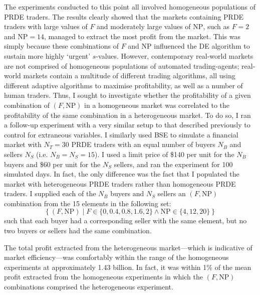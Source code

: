 \documentclass[conference]{IEEEtran}
\begin{document}
The experiments conducted to this point all involved homogeneous populations of PRDE traders.
The results clearly showed that the markets containing PRDE traders with large values of $F$ and moderately large values of $\mathrm{NP}$, such as $F=2$ and $\mathrm{NP}=14$, managed to extract the most profit from the market.
This was simply because these combinations of $F$ and $\mathrm{NP}$ influenced the DE algorithm to sustain more highly `urgent' $s$-values.
However, contemporary real-world markets are not comprised of homogeneous populations of automated trading-agents; real-world markets contain a multitude of different trading algorithms, all using different adaptive algorithms to maximise profitability, as well as a number of human traders.
Thus, I sought to investigate whether the profitability of a given combination of $(F, \mathrm{NP})$ in a homogeneous market was correlated to the profitability of the same combination in a heterogeneous market.
To do so, I ran a follow-up experiment with a very similar setup to that described previously to control for extraneous variables.
I similarly used BSE to simulate a financial market with $N_T=30$ PRDE traders with an equal number of buyers $N_B$ and sellers $N_S$ (i.e. $N_B=N_S=15$).
I used a limit price of \$140 per unit for the $N_B$ buyers and \$60 per unit for the $N_S$ sellers, and ran the experiment for 100 simulated days.
In fact, the only difference was the fact that I populated the market with heterogeneous PRDE traders rather than homogeneous PRDE traders.
I supplied each of the $N_B$ buyers and $N_S$ sellers an $(F,\mathrm{NP})$ combination from the 15 elements in the following set:
\[
  \left\{ (F, \mathrm{NP}) \mid F\in\{0, 0.4, 0.8, 1.6, 2\} \land \mathrm{NP} \in \{4, 12, 20 \} \right\}
\]
such that each buyer had a corresponding seller with the same element, but no two buyers or sellers had the same combination.

The total profit extracted from the heterogeneous market---which is indicative of market efficiency---was comfortably within the range of the homogeneous experiments at approximately 1.43 billion.
In fact, it was within 1\% of the mean profit extracted from the homogeneous experiments in which the $(F,\mathrm{NP})$ combinations comprised the heterogeneous experiment.
\end{document}
